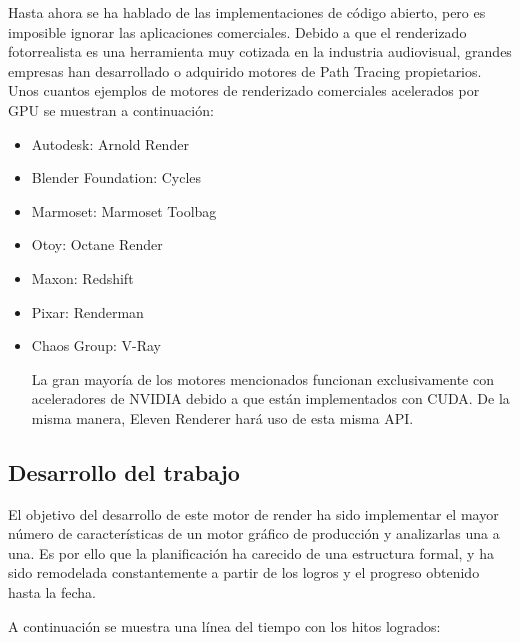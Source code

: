 Hasta ahora se ha hablado de las implementaciones de código abierto, pero es imposible ignorar las aplicaciones comerciales. Debido a que el renderizado fotorrealista es una herramienta muy cotizada en la industria audiovisual, grandes empresas han desarrollado o adquirido motores de Path Tracing propietarios. Unos cuantos ejemplos de motores de renderizado comerciales acelerados por GPU se muestran a continuación:
\begin{itemize}

\item Autodesk: Arnold Render
\item Blender Foundation: Cycles
\item Marmoset: Marmoset Toolbag
\item Otoy: Octane Render
\item Maxon: Redshift
\item Pixar: Renderman
\item Chaos Group: V-Ray

La gran mayoría de los motores mencionados funcionan exclusivamente con aceleradores de NVIDIA debido a que están implementados con CUDA. De la misma manera, Eleven Renderer hará uso de esta misma API.

\end{itemize}


\subsection{Desarrollo del trabajo}
	
El objetivo del desarrollo de este motor de render ha sido implementar el mayor número de características de un motor gráfico de producción y analizarlas una a una. Es por ello que la planificación ha carecido de una estructura formal, y ha sido remodelada constantemente a partir de los logros y el progreso obtenido hasta la fecha.


A continuación se muestra una línea del tiempo con los hitos logrados:	


